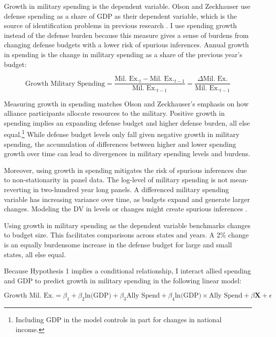 \documentclass[12pt]{article}
\begin{document}
Growth in military spending is the dependent variable. 
Olson and Zeckhauser use defense spending as a share of GDP as their dependent variable, which is the source of identification problems in previous research \citep{Kronmal1993, PluemperNeumayer2015}. 
I use spending growth instead of the defense burden because this measure gives a sense of burdens from changing defense budgets with a lower risk of spurious inferences. 
Annual growth in spending is the change in military spending as a share of the previous year's budget:


\begin{equation}
\mbox{Growth Military Spending} = \frac{\mbox{Mil. Ex.}_t - \mbox{Mil. Ex.}_{t-1} }{ \mbox{Mil. Ex.}_{t-1} } = \frac{\Delta \mbox{Mil. Ex.} }{ \mbox{Mil. Ex.}_{t-1} }
\end{equation} 


Measuring growth in spending matches Olson and Zeckhauser's emphasis on how alliance participants allocate resources to the military.
Positive growth in spending implies an expanding defense budget and higher defense burden, all else equal.\footnote{Including GDP in the model controls in part for changes in national income.} 
While defense budget levels only fall given negative growth in military spending, the accumulation of differences between higher and lower spending growth over time can lead to divergences in military spending levels and burdens. 


Moreover, using growth in spending mitigates the risk of spurious inferences due to non-stationarity in panel data. 
The log-level of military spending is not mean-reverting in two-hundred year long panels.
A differenced military spending variable has increasing variance over time, as budgets expand and generate larger changes. 
Modeling the DV in levels or changes might create spurious inferences \citep{GrangerNewbold1974}. 


Using growth in military spending as the dependent variable benchmarks changes to budget size. 
This facilitates comparisons across states and years. 
A 2\% change is an equally burdensome increase in the defense budget for large and small states, all else equal. 


Because Hypothesis 1 implies a conditional relationship, I interact allied spending and GDP to predict growth in military spending in the following linear model:

\begin{equation} 
\mbox{Growth Mil. Ex.} = \beta_1 + \beta_2 \mbox{ln(GDP)} + \beta_3 \mbox{Ally Spend} + \beta_4 \mbox{ln(GDP)} \times \mbox{Ally Spend} + \beta \mathbf{X} + \epsilon
\end{equation}
\end{document}
